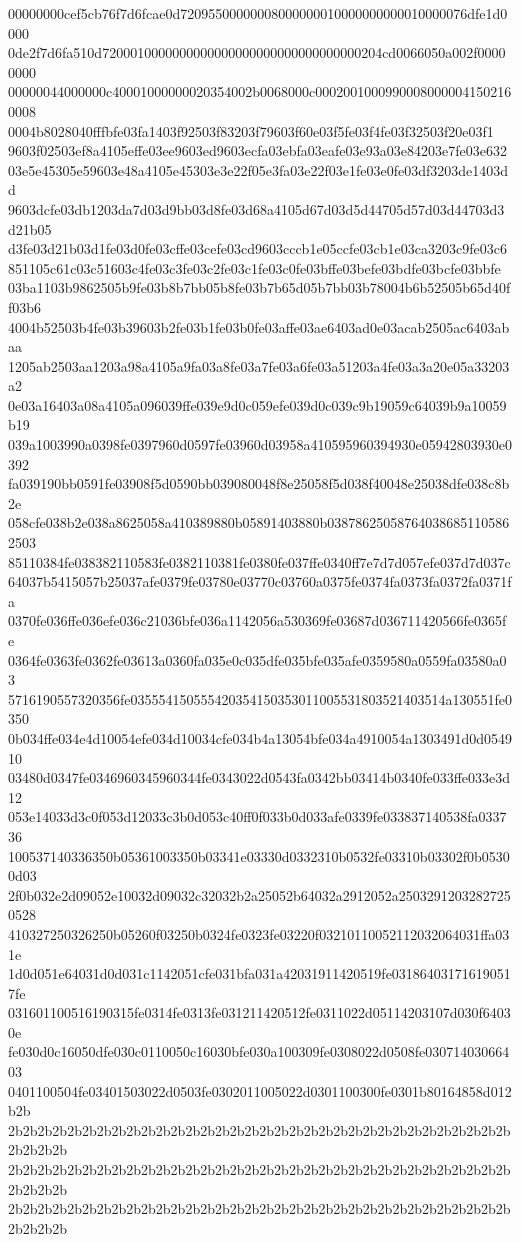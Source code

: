 00000000cef5cb76f7d6fcae0d72095500000008000000010000000000010000076dfe1d0000
0de2f7d6fa510d7200010000000000000000000000000000000204cd0066050a002f00000000
00000044000000c40001000000020354002b0068000c00020010009900080000041502160008
0004b8028040fffbfe03fa1403f92503f83203f79603f60e03f5fe03f4fe03f32503f20e03f1
9603f02503ef8a4105effe03ee9603ed9603ecfa03ebfa03eafe03e93a03e84203e7fe03e632
03e5e45305e59603e48a4105e45303e3e22f05e3fa03e22f03e1fe03e0fe03df3203de1403dd
9603dcfe03db1203da7d03d9bb03d8fe03d68a4105d67d03d5d44705d57d03d44703d3d21b05
d3fe03d21b03d1fe03d0fe03cffe03cefe03cd9603cccb1e05ccfe03cb1e03ca3203c9fe03c6
851105c61c03c51603c4fe03c3fe03c2fe03c1fe03c0fe03bffe03befe03bdfe03bcfe03bbfe
03ba1103b9862505b9fe03b8b7bb05b8fe03b7b65d05b7bb03b78004b6b52505b65d40ff03b6
4004b52503b4fe03b39603b2fe03b1fe03b0fe03affe03ae6403ad0e03acab2505ac6403abaa
1205ab2503aa1203a98a4105a9fa03a8fe03a7fe03a6fe03a51203a4fe03a3a20e05a33203a2
0e03a16403a08a4105a096039ffe039e9d0c059efe039d0c039c9b19059c64039b9a10059b19
039a1003990a0398fe0397960d0597fe03960d03958a410595960394930e05942803930e0392
fa039190bb0591fe03908f5d0590bb039080048f8e25058f5d038f40048e25038dfe038c8b2e
058cfe038b2e038a8625058a410389880b05891403880b038786250587640386851105862503
85110384fe038382110583fe0382110381fe0380fe037ffe0340ff7e7d7d057efe037d7d037c
64037b5415057b25037afe0379fe03780e03770c03760a0375fe0374fa0373fa0372fa0371fa
0370fe036ffe036efe036c21036bfe036a1142056a530369fe03687d036711420566fe0365fe
0364fe0363fe0362fe03613a0360fa035e0c035dfe035bfe035afe0359580a0559fa03580a03
5716190557320356fe035554150555420354150353011005531803521403514a130551fe0350
0b034ffe034e4d10054efe034d10034cfe034b4a13054bfe034a4910054a1303491d0d054910
03480d0347fe0346960345960344fe0343022d0543fa0342bb03414b0340fe033ffe033e3d12
053e14033d3c0f053d12033c3b0d053c40ff0f033b0d033afe0339fe033837140538fa033736
100537140336350b05361003350b03341e03330d0332310b0532fe03310b03302f0b05300d03
2f0b032e2d09052e10032d09032c32032b2a25052b64032a2912052a25032912032827250528
410327250326250b05260f03250b0324fe0323fe03220f03210110052112032064031ffa031e
1d0d051e64031d0d031c1142051cfe031bfa031a42031911420519fe031864031716190517fe
031601100516190315fe0314fe0313fe031211420512fe0311022d05114203107d030f64030e
fe030d0c16050dfe030c0110050c16030bfe030a100309fe0308022d0508fe03071403066403
0401100504fe03401503022d0503fe0302011005022d0301100300fe0301b80164858d012b2b
2b2b2b2b2b2b2b2b2b2b2b2b2b2b2b2b2b2b2b2b2b2b2b2b2b2b2b2b2b2b2b2b2b2b2b2b2b2b
2b2b2b2b2b2b2b2b2b2b2b2b2b2b2b2b2b2b2b2b2b2b2b2b2b2b2b2b2b2b2b2b2b2b2b2b2b2b
2b2b2b2b2b2b2b2b2b2b2b2b2b2b2b2b2b2b2b2b2b2b2b2b2b2b2b2b2b2b2b2b2b2b2b2b2b2b
